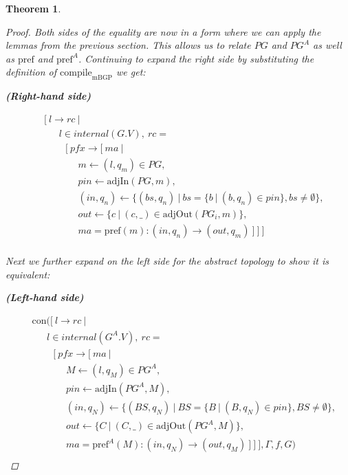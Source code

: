 \documentclass[twocolumn, openany]{sig-alternate-10pt}
\newcommand{\Con}{\mathrm{con}}
\newcommand{\CompileMbgp}{\ensuremath{\mathrm{compile}_\mathrm{mBGP}}}
\newcommand{\Pref}{\ensuremath{\mathrm{pref}}}
\newtheorem{thm}{Theorem}
\begin{document}
\begin{thm}
\begin{proof}
    Both sides of the equality are now in a form where we can apply the lemmas from the previous section.
    This allows us to relate $PG$ and $PG^A$ as well as $\Pref$ and $\Pref^A$.
    Continuing to expand the right side by substituting the definition of $\CompileMbgp$ we get: 

    \vspace{1em}
    \noindent
    \textbf{(Right-hand side)}

  \[ \begin{array}{l}
     ~~~~~ [~ l \rightarrow rc ~\vert~ \\
     ~~~~~~~~~~~~ l \in internal(G.V), ~rc =  \\
     ~~~~~~~~~~~~~~~ [~ pfx \rightarrow [~ ma ~\vert~ \\
     ~~~~~~~~~~~~~~~~~~~~~ m \leftarrow (l,q_m) \in PG, \\
     ~~~~~~~~~~~~~~~~~~~~~ pin \leftarrow \text{adjIn}(PG,m), \\
     ~~~~~~~~~~~~~~~~~~~~~ (in,q_n) \leftarrow \{ (bs,q_n) ~\vert~ bs=\{b ~\vert~ (b,q_n) \in pin \}, bs \neq \emptyset \}, \\
     ~~~~~~~~~~~~~~~~~~~~~ out \leftarrow \{ c ~\vert~ (c,\_) \in \text{adjOut}(PG_i,m) \}, \\
     ~~~~~~~~~~~~~~~~~~~~~ ma = \Pref(m) : (in,q_n) \rightarrow (out,q_m) ~] ~] ~]\\
  \end{array} \]%

  Next we further expand on the left side for the abstract topology to show it is equivalent:

    \vspace{1em}
    \noindent
    \textbf{(Left-hand side)}

  \[ \begin{array}{l}
     ~~~~~ \Con([~ l \rightarrow rc ~\vert~ \\
     ~~~~~~~~~~~~ l \in internal(G^A.V), ~rc =  \\
     ~~~~~~~~~~~~~~~ [~ pfx \rightarrow [~ ma ~\vert~ \\
     ~~~~~~~~~~~~~~~~~~~~~ M \leftarrow (l,q_M) \in PG^A, \\
     ~~~~~~~~~~~~~~~~~~~~~ pin \leftarrow \text{adjIn}(PG^A,M), \\
     ~~~~~~~~~~~~~~~~~~~~~ (in,q_N) \leftarrow \{ (BS,q_N) ~\vert~ BS=\{B ~\vert~ (B,q_N) \in pin \}, BS \neq \emptyset \}, \\
     ~~~~~~~~~~~~~~~~~~~~~ out \leftarrow \{ C ~\vert~ (C,\_) \in \text{adjOut}(PG^A,M) \}, \\
     ~~~~~~~~~~~~~~~~~~~~~ ma = \Pref^A(M) : (in,q_N) \rightarrow (out,q_M) ~] ~] ~], \Gamma, f, G) \\
  \end{array} \]%


\end{proof}
\end{thm}
\end{document}
